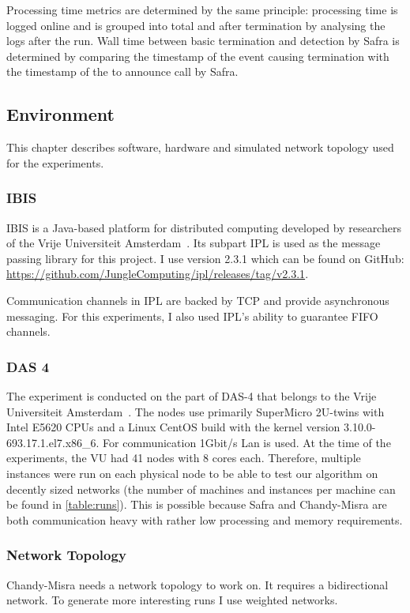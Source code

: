 Processing time metrics are determined by the same principle: processing time is logged online and is grouped into total and after termination by analysing the logs after the run.
Wall time between basic termination and detection by Safra is determined by comparing the timestamp of the event causing termination with the timestamp of the to announce call by Safra.

\subsection{Environment}
This chapter describes software, hardware and simulated network topology used for the experiments.
\subsubsection{IBIS}
IBIS is a Java-based platform for distributed computing developed by researchers of the Vrije Universiteit Amsterdam~\cite{bal2010}.
Its subpart IPL is used as the message passing library for this project.
I use version 2.3.1 which can be found on GitHub: \href{https://github.com/JungleComputing/ipl/releases/tag/v2.3.1}{https://github.com/JungleComputing/ipl/releases/tag/v2.3.1}.

Communication channels in IPL are backed by TCP and provide asynchronous messaging.
For this experiments, I also used IPL's ability to guarantee FIFO channels.

\subsubsection{DAS 4}
The experiment is conducted on the part of DAS-4 that belongs to the Vrije Universiteit Amsterdam~\cite{bal2016}.
The nodes use primarily SuperMicro 2U-twins with Intel E5620 CPUs and a Linux CentOS build with the kernel version 3.10.0-693.17.1.el7.x86\_6.
For communication 1Gbit/s Lan is used.
At the time of the experiments, the VU had 41 nodes with 8 cores each.
Therefore, multiple instances were run on each physical node to be able to test our algorithm on decently sized networks (the number of machines and instances per machine can be found in \cref{table:runs}).
This is possible because Safra and Chandy-Misra are both communication heavy with rather low processing and memory requirements.

\newpage
\subsubsection{Network Topology}
Chandy-Misra needs a network topology to work on.
It requires a bidirectional network.
To generate more interesting runs I use weighted networks.

